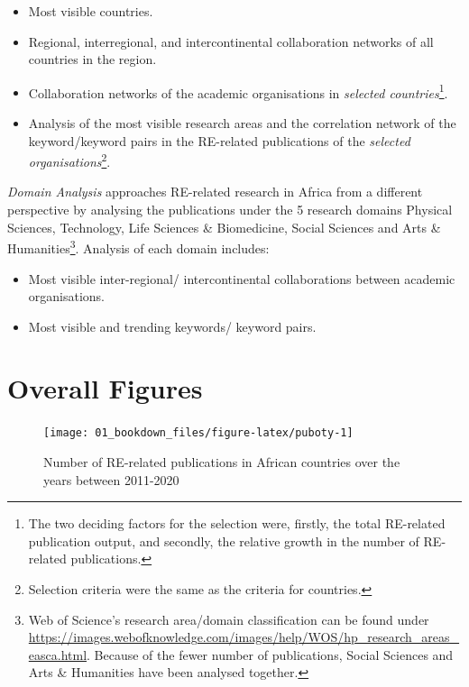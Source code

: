 \documentclass[
]{book}
\providecommand{\tightlist}{%
  \setlength{\itemsep}{0pt}\setlength{\parskip}{0pt}}
\begin{document}
\begin{itemize}
\tightlist
\item
  Most visible countries.
\item
  Regional, interregional, and intercontinental collaboration networks of all countries in the region.
\item
  Collaboration networks of the academic organisations in \emph{selected countries}\footnote{The two deciding factors for the selection were, firstly, the total RE-related
    publication output, and secondly, the relative growth in the number of RE-related publications.}.
\item
  Analysis of the most visible research areas and the correlation network of the
  keyword/keyword pairs in the RE-related publications of the \emph{selected organisations}\footnote{Selection criteria were the same as the criteria for countries.}.
\end{itemize}

\emph{Domain Analysis} approaches RE-related research in Africa from a different perspective
by analysing the publications under the 5 research domains Physical Sciences,
Technology, Life Sciences \& Biomedicine, Social Sciences and Arts \& Humanities\footnote{Web of Science's research area/domain classification can be found under \url{https://images.webofknowledge.com/images/help/WOS/hp_research_areas_easca.html}. Because of the fewer number of publications, Social Sciences and Arts \& Humanities have been analysed together.}. Analysis
of each domain includes:

\begin{itemize}
\tightlist
\item
  Most visible inter-regional/ intercontinental collaborations between academic organisations.
\item
  Most visible and trending keywords/ keyword pairs.
\end{itemize}

\hypertarget{overall-figures}{%
\section{Overall Figures}\label{overall-figures}}

\begin{figure}
\texttt{[image: 01\_bookdown\_files/figure-latex/puboty-1]} \caption{Number of RE-related publications in African countries over the years between 2011-2020}\label{fig:puboty}
\end{figure}
\end{document}

